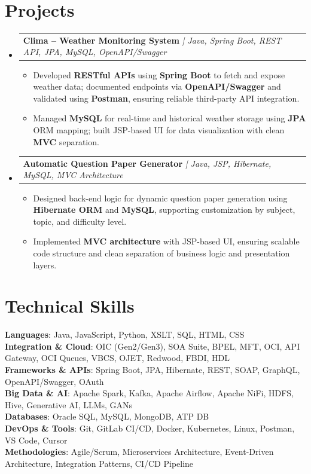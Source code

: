 \documentclass[letterpaper,11pt]{article}
\makeatletter
\newcommand{\resumeItem}[1]{
  \item\small{
    {#1 \vspace{-2pt}}
  }
}
\newcommand{\resumeProjectHeading}[2]{
    \item
    \begin{tabular*}{0.97\textwidth}{l@{\extracolsep{\fill}}r}
      \small#1 & #2 \\
    \end{tabular*}\vspace{-7pt}
}
\newcommand{\resumeSubHeadingListStart}{\begin{itemize}[leftmargin=0.15in, label={}]}
\newcommand{\resumeSubHeadingListEnd}{\end{itemize}}
\newcommand{\resumeItemListStart}{\begin{itemize}}
\newcommand{\resumeItemListEnd}{\end{itemize}\vspace{-5pt}}
\makeatother
\begin{document}
\section{Projects}
\resumeSubHeadingListStart
    \resumeProjectHeading
        {\textbf{Clima -- Weather Monitoring System} \textit{| Java, Spring Boot, REST API, JPA, MySQL, OpenAPI/Swagger}}{}
    \resumeItemListStart
        \resumeItem{Developed \textbf{RESTful APIs} using \textbf{Spring Boot} to fetch and expose weather data; documented endpoints via \textbf{OpenAPI/Swagger} and validated using \textbf{Postman}, ensuring reliable third-party API integration.}
        \resumeItem{Managed \textbf{MySQL} for real-time and historical weather storage using \textbf{JPA} ORM mapping; built JSP-based UI for data visualization with clean \textbf{MVC} separation.}
    \resumeItemListEnd
    \resumeProjectHeading
        {\textbf{Automatic Question Paper Generator} \textit{| Java, JSP, Hibernate, MySQL, MVC Architecture}}{}
    \resumeItemListStart
        \resumeItem{Designed back-end logic for dynamic question paper generation using \textbf{Hibernate ORM} and \textbf{MySQL}, supporting customization by subject, topic, and difficulty level.}
        \resumeItem{Implemented \textbf{MVC architecture} with JSP-based UI, ensuring scalable code structure and clean separation of business logic and presentation layers.}
    \resumeItemListEnd
\resumeSubHeadingListEnd

\section{Technical Skills}
\begin{itemize}[leftmargin=0.15in, label={}]
    \small{\item{
        \textbf{Languages}{: Java, JavaScript, Python, XSLT, SQL, HTML, CSS} \\
        \textbf{Integration \& Cloud}{: OIC (Gen2/Gen3), SOA Suite, BPEL, MFT, OCI, API Gateway, OCI Queues, VBCS, OJET, Redwood, FBDI, HDL} \\
        \textbf{Frameworks \& APIs}{: Spring Boot, JPA, Hibernate, REST, SOAP, GraphQL, OpenAPI/Swagger, OAuth} \\
        \textbf{Big Data \& AI}{: Apache Spark, Kafka, Apache Airflow, Apache NiFi, HDFS, Hive, Generative AI, LLMs, GANs} \\
        \textbf{Databases}{: Oracle SQL, MySQL, MongoDB, ATP DB} \\
        \textbf{DevOps \& Tools}{: Git, GitLab CI/CD, Docker, Kubernetes, Linux, Postman, VS Code, Cursor} \\
        \textbf{Methodologies}{: Agile/Scrum, Microservices Architecture, Event-Driven Architecture, Integration Patterns, CI/CD Pipeline}
    }}
\end{itemize}
\end{document}
